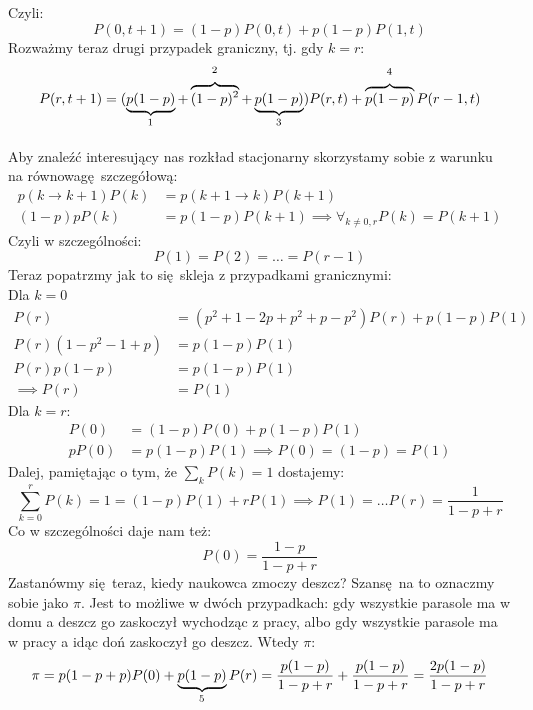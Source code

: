 \documentclass[12pt,a4paper]{article}
\begin{document}
\addtocounter{footnote}{-3}
Czyli:
\[
    P(0, t+1) = (1-p) P(0, t) + p(1-p) P(1,t)
\]
Rozważmy teraz drugi przypadek graniczny, tj. gdy $k=r$:
\[
    P(r, t+1) = (\underbrace{p(1-p)}_{\footnotemark} + \overbrace{(1-p)^2}^{\footnotemark} + \underbrace{p(1-p)}_{\footnotemark}) P(r,t) + \overbrace{p(1-p)}^{\footnotemark} P(r-1, t)
\]
\addtocounter{footnote}{-3}

Aby znaleźć interesujący nas rozkład stacjonarny skorzystamy sobie z warunku na równowagę szczegółową:
\begin{align*}
    p(k\to k+1) P(k) &= p(k+1 \to k) P(k+1)\\
    (1-p)pP(k) &= p(1-p)P(k+1) \implies \forall_{k\neq0, r} P(k) = P(k+1)
\end{align*}
Czyli w szczególności:
\[
    P(1) = P(2) = \dots = P(r-1)
\]
Teraz popatrzmy jak to się skleja z przypadkami granicznymi:\\
Dla $k=0$
\begin{align*}
    P(r) &= (p^2 + 1 - 2p + p^2 + p - p^2) P(r) + p(1-p) P(1)\\
    P(r)(1 - p^2 - 1 + p) &= p(1-p)P(1)\\
    P(r)p(1-p) &= p(1-p)P(1)\\
    \implies P(r) &= P(1)
\end{align*}
Dla $k=r$:
\begin{align*}
    P(0) &= (1-p)P(0) + p(1-p) P(1)\\
    pP(0) &= p(1-p) P(1) \implies P(0) = (1-p) = P(1)
\end{align*}
Dalej, pamiętając o tym, że $\sum_k P(k) = 1$ dostajemy:
\[
    \sum_{k=0}^r P(k) = 1 = (1-p) P(1) + rP(1) \implies P(1) = \dots P(r) = \frac{1}{1 - p + r}
\]
Co w szczególności daje nam też:
\[
    P(0) = \frac{1-p}{1 - p + r}
\]
Zastanówmy się teraz, kiedy naukowca zmoczy deszcz? Szansę na to oznaczmy sobie jako $\pi$. Jest to możliwe w dwóch przypadkach: gdy wszystkie parasole ma w domu a deszcz go zaskoczył wychodząc z pracy, albo gdy wszystkie parasole ma w pracy a idąc doń zaskoczył go deszcz. Wtedy $\pi$:
\[
    \pi = p(1-p+p) P(0) + \underbrace{p(1-p)}_{\footnotemark} P(r) = \frac{p(1-p)}{1 - p + r} + \frac{p(1-p)}{1-p+r} = \frac{2p(1-p)}{1 - p +r}
\]
\end{document}
